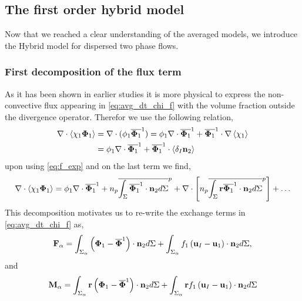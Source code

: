 \subsection{The first order hybrid model}

Now that we reached a clear understanding of the averaged models, we introduce the Hybrid model for dispersed two phase flows. 

\subsubsection{First decomposition of the flux term}
As it has been shown in earlier studies \citep{jackson2000dynamics} it is more physical to express the non-convective flux appearing in \ref{eq:avg_dt_chi_f} with the volume fraction outside the divergence operator. 
Therefor we use the following relation, 
\begin{align*}
    \mathbf{\nabla} \cdot \left<\chi_1 \mathbf{\Phi}_1\right>
    &= \mathbf{\nabla} \cdot (\phi_1 \overline{ \mathbf{\Phi}_1}^1)
    = \phi_1 \mathbf{\nabla} \cdot  \overline{ \mathbf{\Phi}_1}^1
    +  \overline{ \mathbf{\Phi}_1}^1 \cdot \mathbf{\nabla} \left<\chi_1\right>\\
    &= \phi_1 \mathbf{\nabla} \cdot  \overline{ \mathbf{\Phi}_1}^1
    +  \overline{ \mathbf{\Phi}_1}^1 \cdot \left<\delta_I \textbf{n}_2\right>\\
\end{align*}
upon using \ref{eq:f_exp} and on the last term we find, 
\begin{equation}
    \mathbf{\nabla} \cdot \left<\chi_1 \mathbf{\Phi}_1\right>
    =  \phi_1 \mathbf{\nabla} \cdot  \overline{ \mathbf{\Phi}_1}^1
    + n_p\overline{\int_{\Sigma} \overline{ \mathbf{\Phi}_1}^1 \cdot  \textbf{n}_2 d\Sigma}^{p}
    +\mathbf{\nabla}\cdot \left[
        n_p\overline{\int_{\Sigma} \textbf{r}\overline{ \mathbf{\Phi}_1}^1 \cdot  \textbf{n}_2 d\Sigma}^{p}
    \right] 
    +\ldots
\end{equation}
This decomposition motivates us to re-write the exchange terms in \ref{eq:avg_dt_chi_f} as, 
\begin{equation*}
    \textbf{F}_\alpha = 
    \int_{\Sigma_\alpha}
    \left(
        \mathbf{\Phi}_1 
        - \overline{\mathbf{\Phi}}^1
    \right)  
    \cdot \textbf{n}_2d\Sigma
    + 
    \int_{\Sigma_\alpha}f_1
    \left(
        \textbf{u}_I
        - \textbf{u}_1
    \right)
    \cdot \textbf{n}_2d\Sigma,
\end{equation*}
and 
\begin{equation*}
    \textbf{M}_\alpha = \int_{\Sigma_\alpha} \textbf{r}
        \left(\mathbf{\Phi}_1- \overline{\mathbf{\Phi}}^1\right)\cdot \textbf{n}_2d\Sigma
        + \int_{\Sigma_\alpha} \textbf{r}f_1
        \left(
            \textbf{u}_I
            - \textbf{u}_1
        \right)
    \cdot \textbf{n}_2d\Sigma
\end{equation*}
